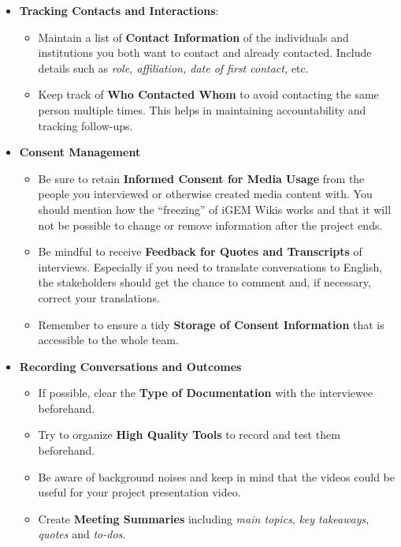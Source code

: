 \begin{itemize}
    \item \textbf{Tracking Contacts and Interactions}:
    \begin{itemize}
        \item Maintain a list of \textbf{Contact Information} of the individuals and institutions you both want to contact and already contacted.
        Include details such as \textit{role, affiliation, date of first contact,} etc.
        \item Keep track of \textbf{Who Contacted Whom} to avoid contacting the same person multiple times.
        This helps in maintaining accountability and tracking follow-ups.
    \end{itemize}
    \item \textbf{Consent Management} 
    \begin{itemize}
        \item Be sure to retain \textbf{Informed Consent for Media Usage} from the people you interviewed or otherwise created media content with.
        You should mention how the ``freezing'' of iGEM Wikis works and that it will not be possible to change or remove information after the project ends.
        \item Be mindful to receive \textbf{Feedback for Quotes and Transcripts} of interviews.  Especially if you need to translate conversations to English, the stakeholders should get the chance to comment and, if necessary, correct your translations.
        \item Remember to ensure a tidy \textbf{Storage of Consent Information} that is accessible to the whole team.
    \end{itemize}
    \item \textbf{Recording Conversations and Outcomes }
    \begin{itemize}
        \item If possible, clear the \textbf{Type of Documentation} with the interviewee beforehand.
        \item Try to organize \textbf{High Quality Tools} to record and test them beforehand.
        \item Be aware of background noises and keep in mind that the videos could be useful for your project presentation video.
        \item Create \textbf{Meeting Summaries} including \textit{main topics}, \textit{key takeaways}, \textit{quotes} and \textit{to-dos}.
    \end{itemize}

\end{itemize}
